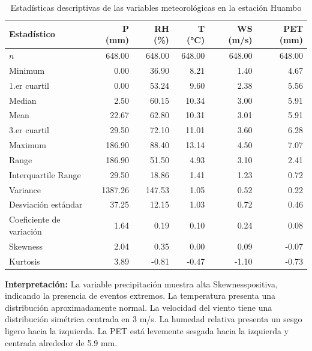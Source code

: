 \begin{table}[H]
\centering
\caption{Estadísticas descriptivas de las variables meteorológicas en la estación Huambo}
\label{tab:stat_huambo}
\scriptsize
\begin{tabular}{lrrrrr}
\toprule
\textbf{Estadístico} & \textbf{P (mm)} & \textbf{RH (\%)} & \textbf{T (°C)} & \textbf{WS (m/s)} & \textbf{PET (mm)} \\
\midrule
$n$         & 648.00 & 648.00 & 648.00 & 648.00 & 648.00 \\
Minimum                         & 0.00   & 36.90  & 8.21   & 1.40   & 4.67   \\
1.er cuartil                 & 0.00   & 53.24  & 9.60   & 2.38   & 5.56   \\
Median                       & 2.50   & 60.15  & 10.34  & 3.00   & 5.91   \\
Mean                         & 22.67  & 62.80  & 10.31  & 3.01   & 5.91   \\
3.er cuartil                & 29.50  & 72.10  & 11.01  & 3.60   & 6.28   \\
Maximum                        & 186.90 & 88.40  & 13.14  & 4.50   & 7.07   \\
Range                         & 186.90 & 51.50  & 4.93   & 3.10   & 2.41   \\
Interquartile Range          & 29.50  & 18.86  & 1.41   & 1.23   & 0.72   \\
Variance                    & 1387.26& 147.53 & 1.05   & 0.52   & 0.22   \\
Desviación estándar           & 37.25  & 12.15  & 1.03   & 0.72   & 0.46   \\
Coeficiente de variación     & 1.64   & 0.19   & 0.10   & 0.24   & 0.08   \\
Skewness                    & 2.04   & 0.35   & 0.00   & 0.09   & -0.07  \\
Kurtosis                      & 3.89   & -0.81  & -0.47  & -1.10  & -0.73  \\
\bottomrule
\end{tabular}
\end{table}

\textbf{Interpretación:} La variable precipitación muestra alta Skewnesspositiva, indicando la presencia de eventos extremos. La temperatura presenta una distribución aproximadamente normal. La velocidad del viento tiene una distribución simétrica centrada en 3 m/s. La humedad relativa presenta un sesgo ligero hacia la izquierda. La PET está levemente sesgada hacia la izquierda y centrada alrededor de 5.9 mm.

